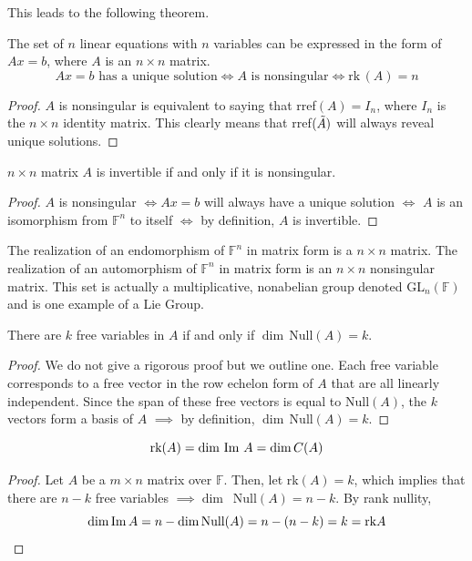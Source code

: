  This leads to the following theorem. 

  \begin{theorem}
    The set of $n$ linear equations with $n$ variables can be expressed in the form of $A x = b$, where $A$ is an $n \times n$ matrix. 
    \begin{equation}
      A x = b \text{ has a unique solution} \iff A \text{ is nonsingular} \iff \text{rk}\,(A) = n
    \end{equation}
  \end{theorem}
  \begin{proof}
    $A$ is nonsingular is equivalent to saying that rref$(A) = I_n$, where $I_n$ is the $n \times n$ identity matrix. This clearly means that rref$(\Tilde{A})$ will always reveal unique solutions. 
  \end{proof}

  \begin{theorem}
    $n \times n$ matrix $A$ is invertible if and only if it is nonsingular. 
  \end{theorem}
  \begin{proof}
    $A$ is nonsingular $\iff A x = b$ will always have a unique solution $\iff$ $A$ is an isomorphism from $\mathbb{F}^n$ to itself $\iff$ by definition, $A$ is invertible. 
  \end{proof}

  The realization of an endomorphism of $\mathbb{F}^n$ in matrix form is a $n \times n$ matrix. The realization of an automorphism of $\mathbb{F}^n$ in matrix form is an $n \times n$ nonsingular matrix. This set is actually a multiplicative, nonabelian group denoted GL$_n(\mathbb{F})$ and is one example of a Lie Group. 

  \begin{theorem}
    There are $k$ free variables in $A$ if and only if $\dim\,$Null$(A) = k$. 
  \end{theorem}
  \begin{proof}
    We do not give a rigorous proof but we outline one. Each free variable corresponds to a free vector in the row echelon form of $A$ that are all linearly independent. Since the span of these free vectors is equal to Null$(A)$, the $k$ vectors form a basis of $A$ $\implies$ by definition, $\dim\,$Null$(A) = k$.
  \end{proof}

  \begin{theorem}
    \begin{equation}
      \text{rk}(A) = \dim \, \operatorname{Im} \,A = \dim C(A)
    \end{equation}
  \end{theorem}
  \begin{proof}
    Let $A$ be a $m \times n$ matrix over $\mathbb{F}$. Then, let rk$(A) = k$, which implies that there are $n-k$ free variables $\implies \dim \,$ Null$(A) = n - k$. By rank nullity, 
    \begin{equation}
      \dim \operatorname{Im}{A} = n - \dim \text{Null}(A) = n - (n -k) = k = \text{rk} A 
    \end{equation}
  \end{proof}

